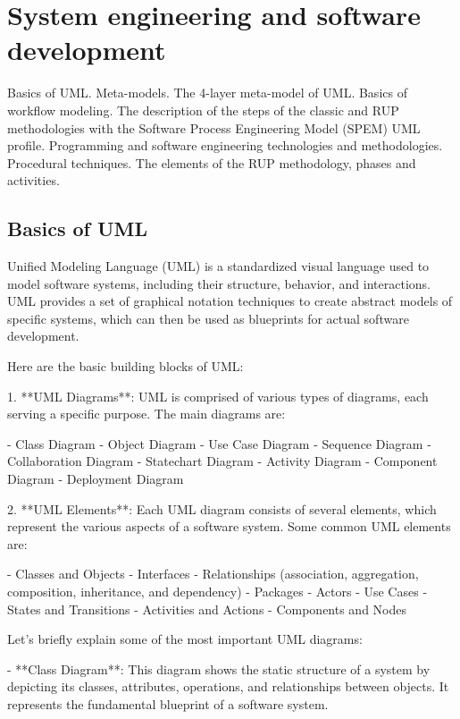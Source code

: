 \documentclass{article}
\begin{document}
\section{System engineering and software development}

Basics of UML. Meta-models. The 4-layer meta-model of UML. Basics of workflow modeling. The description of the steps of the classic and RUP methodologies with the Software Process Engineering Model (SPEM) UML profile. Programming and software engineering technologies and methodologies. Procedural techniques. The elements of the RUP methodology, phases and activities.


\subsection{Basics of UML}

Unified Modeling Language (UML) is a standardized visual language used to model software systems, including their structure, behavior, and interactions. UML provides a set of graphical notation techniques to create abstract models of specific systems, which can then be used as blueprints for actual software development.

Here are the basic building blocks of UML:

1. **UML Diagrams**: UML is comprised of various types of diagrams, each serving a specific purpose. The main diagrams are:

   - Class Diagram
   - Object Diagram
   - Use Case Diagram
   - Sequence Diagram
   - Collaboration Diagram
   - Statechart Diagram
   - Activity Diagram
   - Component Diagram
   - Deployment Diagram

2. **UML Elements**: Each UML diagram consists of several elements, which represent the various aspects of a software system. Some common UML elements are:

   - Classes and Objects
   - Interfaces
   - Relationships (association, aggregation, composition, inheritance, and dependency)
   - Packages
   - Actors
   - Use Cases
   - States and Transitions
   - Activities and Actions
   - Components and Nodes

Let's briefly explain some of the most important UML diagrams:

- **Class Diagram**: This diagram shows the static structure of a system by depicting its classes, attributes, operations, and relationships between objects. It represents the fundamental blueprint of a software system.
\end{document}
